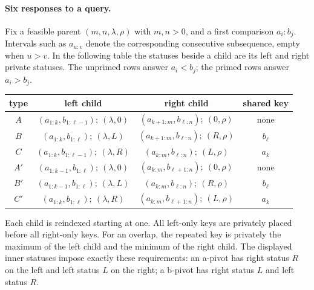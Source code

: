 \documentclass[11pt]{article}
\theoremstyle{definition}
\theoremstyle{remark}
\begin{document}
\paragraph{Six responses to a query.}
Fix a feasible parent $(m,n,\lambda,\rho)$ with $m,n>0$, and a first
comparison $a_i:b_j$.  Intervals such as $a_{u:v}$ denote the corresponding
consecutive subsequence, empty when $u>v$.  In the following table the
statuses beside a child are its left and right private statuses.  The
unprimed rows answer $a_i<b_j$; the primed rows answer $a_i>b_j$.
\begin{center}
\small
\begin{tabular}{c|c|c|c}
type & left child & right child & shared key\\ \hline
$A$ & $(a_{1:k},b_{1:\ell-1});\ (\lambda,0)$
    & $(a_{k+1:m},b_{\ell:n});\ (0,\rho)$ & none\\
$B$ & $(a_{1:k},b_{1:\ell});\ (\lambda,L)$
    & $(a_{k+1:m},b_{\ell:n});\ (R,\rho)$ & $b_\ell$\\
$C$ & $(a_{1:k},b_{1:\ell-1});\ (\lambda,R)$
    & $(a_{k:m},b_{\ell:n});\ (L,\rho)$ & $a_k$\\
$A'$ & $(a_{1:k-1},b_{1:\ell});\ (\lambda,0)$
     & $(a_{k:m},b_{\ell+1:n});\ (0,\rho)$ & none\\
$B'$ & $(a_{1:k-1},b_{1:\ell});\ (\lambda,L)$
     & $(a_{k:m},b_{\ell:n});\ (R,\rho)$ & $b_\ell$\\
$C'$ & $(a_{1:k},b_{1:\ell});\ (\lambda,R)$
     & $(a_{k:m},b_{\ell+1:n});\ (L,\rho)$ & $a_k$
\end{tabular}
\end{center}
Each child is reindexed starting at one.  All left-only keys are privately
placed before all right-only keys.  For an overlap, the repeated key is
privately the maximum of the left child and the minimum of the right
child.  The displayed inner statuses impose exactly these requirements:
an a-pivot has right status $R$ on the left and left status $L$ on the
right; a b-pivot has right status $L$ and left status $R$.
\end{document}
